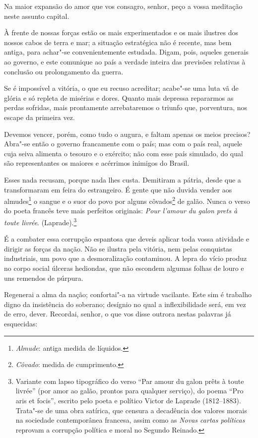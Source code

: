 \sectionitem

Na maior expansão do amor que vos consagro, senhor, peço a vossa
meditação neste assunto capital.

À frente de nossas forças estão os mais experimentados e os mais
ilustres dos nossos cabos de terra e mar; a situação estratégica não é
recente, mas bem antiga, para achar"-se convenientemente estudada.
Digam, pois, aqueles generais ao governo, e este comunique ao país a
verdade inteira das previsões relativas à conclusão ou prolongamento da guerra.

Se é impossível a vitória, o que eu recuso acreditar; acabe"-se uma
luta vã de glória e só repleta de misérias e dores. Quanto mais
depressa repararmos as perdas sofridas, mais prontamente arrebataremos
o triunfo que, porventura, nos escape da primeira vez. 

Devemos vencer, porém, como tudo o augura, e faltam apenas os meios
precisos? Abra"-se então o governo francamente com o país; mas com o
país real, aquele cuja seiva alimenta o tesouro e o exército; não com
esse país simulado, do qual são representantes os maiores e acérrimos
inimigos do Brasil.

Esses nada recusam, porque nada lhes custa. Demitiram a pátria, desde
que a transformaram em feira do estrangeiro. É gente que não duvida
vender aos almudes\footnote{ \textit{Almude}: antiga medida de líquidos.}
 o sangue e o suor do povo por alguns
côvados\footnote{ \textit{Côvado}: medida de cumprimento.}
 de galão. Nunca o verso do poeta francês teve mais perfeitos originais:
\textit{Pour l'amour du galon prets à toute livrée}.
(Laprade).\footnote{ Variante com lapso tipográfico do verso ``Par amour du galon prêts à
toute livrée'' (por amor ao galão, prontos para qualquer serviço), do
poema ``Pro aris et focis'', escrito pelo poeta e político Victor de
Laprade (1812--1883). Trata"-se de uma obra satírica, que censura a
decadência dos valores morais na sociedade contemporânea francesa,
assim como as \textit{Novas cartas políticas} reprovam a corrupção política e
moral no Segundo Reinado.}

É a combater essa corrupção espantosa que deveis aplicar toda vossa
atividade e dirigir as forças da nação. Não se ilustra pela vitória,
nem pelas conquistas industriais, um povo que a desmoralização
contaminou. A lepra do vício produz no corpo social úlceras hediondas,
que não escondem algumas folhas de louro e uns remendos de púrpura. 

Regenerai a alma da nação; confortai"-a na virtude vacilante. Este sim
é trabalho digno da insistência do soberano; desígnio no qual a
inflexibilidade será, em vez de erro, dever. Recordai, senhor, o que
vos disse outrora nestas palavras já esquecidas:

